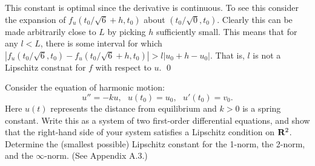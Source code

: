 \documentclass[10pt]{article}
\begin{document}
\begin{solution}[Solution]
This constant is optimal since the derivative is continuous. To see this consider the expansion of \( f_u(t_0/\sqrt{6}+h,t_0) \) about \( (t_0/\sqrt{0},t_0) \). Clearly this can be made arbitrarily close to \( L \) by picking \( h \) sufficiently small. This means that for any \( l < L \), there is some interval for which \( |f_u(t_0/\sqrt{6}, t_0) - f_u(t_0/\sqrt{6}+h,t_0)| > l |u_0+h-u_0| \). That is, \( l \) is not a Lipschitz constnat for \( f \) with respect to \( u \).
 \qed

\end{solution}

\begin{problem}[Problem 2]
Consider the equation of harmonic motion:
\[
u'' = - k u ,~~~u( t_0 ) = u_0 ,~~~u' ( t_0 ) = v_0 .
\]
Here \( u(t) \) represents the distance from equilibrium and \( k > 0 \) is a spring constant.
Write this as a system of two first-order differential equations, and show that the
right-hand side of your system satisfies a Lipschitz condition on \( {\bf R}^2 \).  Determine
the (smallest possible) Lipschitz constant for the 1-norm, the 2-norm, and the \( \infty \)-norm.
(See Appendix A.3.)
\end{problem}
\end{document}
